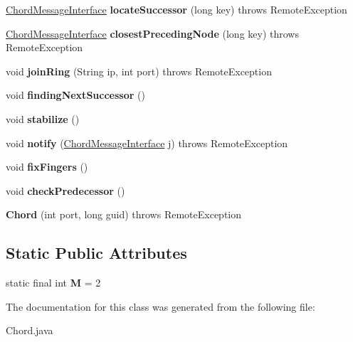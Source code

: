 \begin{DoxyCompactItemize}
\item 
\mbox{\label{class_chord_a7e354ea388d048d4910fa28b182ebe9f}} 
\hyperlink{interface_chord_message_interface}{Chord\+Message\+Interface} {\bfseries locate\+Successor} (long key)  throws Remote\+Exception 
\item 
\mbox{\label{class_chord_aecd3971877558c3b1290bd49d7576ab0}} 
\hyperlink{interface_chord_message_interface}{Chord\+Message\+Interface} {\bfseries closest\+Preceding\+Node} (long key)  throws Remote\+Exception 
\item 
\mbox{\label{class_chord_ace0b8d2768590d7527af155c6573cae7}} 
void {\bfseries join\+Ring} (String ip, int port)  throws Remote\+Exception 
\item 
\mbox{\label{class_chord_a65c855dc1d8c6a82545899cb823dba2e}} 
void {\bfseries finding\+Next\+Successor} ()
\item 
\mbox{\label{class_chord_a8a4b7a1cd88cb3f607ada0629f2ff2dd}} 
void {\bfseries stabilize} ()
\item 
\mbox{\label{class_chord_a4de8b8464782dd96d88deeb35b2f27a2}} 
void {\bfseries notify} (\hyperlink{interface_chord_message_interface}{Chord\+Message\+Interface} j)  throws Remote\+Exception 
\item 
\mbox{\label{class_chord_a02763f74bbd986baa7e6567bf9dc3c95}} 
void {\bfseries fix\+Fingers} ()
\item 
\mbox{\label{class_chord_a530b2ab58c9f4026dadf4293c38c4450}} 
void {\bfseries check\+Predecessor} ()
\item 
\mbox{\label{class_chord_a6e4b3112b0268455fd599c57b5479791}} 
{\bfseries Chord} (int port, long guid)  throws Remote\+Exception 
\end{DoxyCompactItemize}
\subsection*{Static Public Attributes}
\begin{DoxyCompactItemize}
\item 
\mbox{\label{class_chord_a864e0b4011dc157c78a06dd951c6d9ac}} 
static final int {\bfseries M} = 2
\end{DoxyCompactItemize}


The documentation for this class was generated from the following file\+:\begin{DoxyCompactItemize}
\item 
Chord.\+java\end{DoxyCompactItemize}
